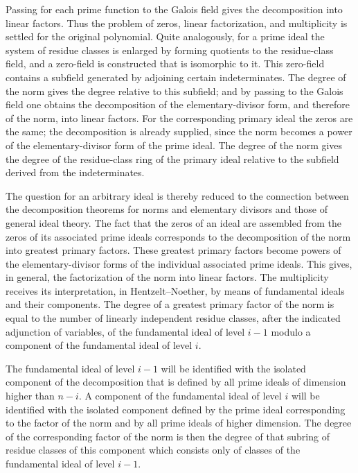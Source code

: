 \documentclass[11pt]{article}
\begin{document}
Passing for each prime function to the Galois field gives the decomposition into linear factors. Thus the problem of zeros, linear factorization, and multiplicity is settled for the original polynomial. Quite analogously, for a prime ideal the system of residue classes is enlarged by forming quotients to the residue-class field, and a zero-field is constructed that is isomorphic to it. This zero-field contains a subfield generated by adjoining certain indeterminates. The degree of the norm gives the degree relative to this subfield; and by passing to the Galois field one obtains the decomposition of the elementary-divisor form, and therefore of the norm, into linear factors. For the corresponding primary ideal the zeros are the same; the decomposition is already supplied, since the norm becomes a power of the elementary-divisor form of the prime ideal. The degree of the norm gives the degree of the residue-class ring of the primary ideal relative to the subfield derived from the indeterminates.

The question for an arbitrary ideal is thereby reduced to the connection between the decomposition theorems for norms and elementary divisors and those of general ideal theory. The fact that the zeros of an ideal are assembled from the zeros of its associated prime ideals corresponds to the decomposition of the norm into greatest primary factors. These greatest primary factors become powers of the elementary-divisor forms of the individual associated prime ideals. This gives, in general, the factorization of the norm into linear factors. The multiplicity receives its interpretation, in Hentzelt--Noether, by means of fundamental ideals and their components. The degree of a greatest primary factor of the norm is equal to the number of linearly independent residue classes, after the indicated adjunction of variables, of the fundamental ideal of level $i-1$ modulo a component of the fundamental ideal of level $i$.

The fundamental ideal of level $i-1$ will be identified with the isolated component of the decomposition that is defined by all prime ideals of dimension higher than $n-i$. A component of the fundamental ideal of level $i$ will be identified with the isolated component defined by the prime ideal corresponding to the factor of the norm and by all prime ideals of higher dimension. The degree of the corresponding factor of the norm is then the degree of that subring of residue classes of this component which consists only of classes of the fundamental ideal of level $i-1$.
\end{document}
